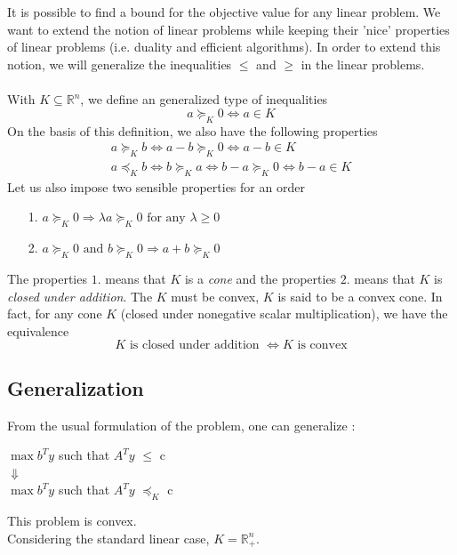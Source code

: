\documentclass[10pt,a4paper]{article}
\begin{document}
\\ \\ It is possible to find a bound for the objective value for any linear problem. We want to extend the notion of linear problems while keeping their 'nice' properties of linear problems (i.e. duality and efficient algorithms). In order to extend this notion, we will generalize the inequalities $\leq$ and $\geq$ in the linear problems.  \\ \\
With $K \subseteq \mathbb{R}^n$, we define an generalized type of inequalities\[ a \succeq_K 0
 \Leftrightarrow a \in K \]
On the basis of this definition, we also have the following properties \begin{align*}
 a \succeq_K b \Leftrightarrow a-b \succeq_K 0
\Leftrightarrow a-b \in K \\ a \preceq_K b
\Leftrightarrow b \succeq_K a \Leftrightarrow b-a \succeq_K 0
\Leftrightarrow b-a \in K \end{align*}
Let us also impose two sensible properties for an order
 \begin{enumerate}
 \item[1.]  
$a \succeq_K 0 \Rightarrow \lambda a \succeq_K 0 \text{ for any } \lambda \ge 0$ 
\item[2.] $a \succeq_K 0 \text{ and } b \succeq_K 0 \Rightarrow a+b \succeq_K 0$
\item[] 
\end{enumerate}
The properties $1.$ means that $K$ is a \emph{cone} and the properties $2.$ means that $K$ is \emph{closed under addition}.
The $K$ must be convex, $K$ is said to be a convex cone. In fact, for any cone $K$ (closed under nonegative scalar multiplication), we have the equivalence
\[ K \text{ is closed under addition } \Leftrightarrow K \text{ is convex} \]

\subsection{Generalization}
From the usual formulation of the problem, one can generalize : 
\begin{center}$\max b^Ty$ such that $A^Ty$ $\leqslant$ c \\
$\Downarrow$ \\
$\max b^Ty$ such that $A^Ty$ $\preceq_K$ c
\end{center}
This problem is convex.\\
Considering the standard linear case, $K = \mathbb{R}^n_+$.
\end{document}
